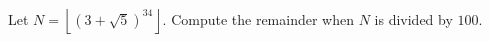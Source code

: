 Let $N=\left\lfloor\left(3+\sqrt5\right)^{34}\right\rfloor$. Compute the remainder when $N$ is divided by $100$.
